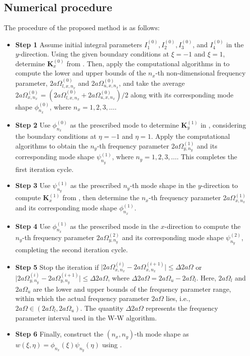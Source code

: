 \documentclass[preprint,12pt,number]{elsarticle}
\begin{document}
\subsection{Numerical procedure}\label{sec:Application procedure}
The procedure of the proposed method is as follows:   
\begin{itemize}[]
\item \textbf{Step 1} Assume initial integral parameters $I^{(0)}_1, I^{(0)}_2, I^{(0)}_3$, and $I^{(0)}_4$ in the $y$-direction. Using the given boundary conditions at $\xi = -1$ and $\xi = 1$, determine $\mathbf{K}^{(0)}_x$ from . 
Then, apply the computational algorithms in  to compute the lower and upper bounds of the $n_x$-th non-dimensional frequency parameter, $2a\Omega^{(0)}_{l,x,n_x}$ and $2a\Omega^{(0)}_{u,x,n_x}$, and take the average $2a\Omega^{(0)}_{x,n_x} = (2a\Omega^{(0)}_{l,x,n_x} + 2a\Omega^{(0)}_{u,x,n_x})/2$ along with its corresponding mode shape $\phi^{(0)}_{n_x}$, where $n_x = 1, 2, 3, \ldots$.

\item \textbf{Step 2} Use $\phi^{(0)}_{n_x}$ as the prescribed mode to determine $\mathbf{K}^{(1)}_y$ in , considering the boundary conditions at $\eta = -1$ and $\eta = 1$. 
Apply the computational algorithms to obtain the $n_y$-th frequency parameter $2a\Omega^{(1)}_{y,n_y}$ and its corresponding mode shape $\psi^{(1)}_{n_y}$, where $n_y = 1, 2, 3, \ldots$. This completes the first iteration cycle.  

\item \textbf{Step 3} Use $\psi^{(1)}_{n_y}$ as the prescribed $n_y$-th mode shape in the $y$-direction to compute $\mathbf{K}^{(1)}_x$ from , then determine the $n_x$-th frequency parameter $2a\Omega^{(1)}_{x,n_x}$ and its corresponding mode shape $\phi^{(1)}_{n_x}$.  

\item \textbf{Step 4} Use $\phi^{(1)}_{n_x}$ as the prescribed mode in the $x$-direction to compute the $n_y$-th frequency parameter $2a\Omega^{(2)}_{y,n_y}$ and its corresponding mode shape $\psi^{(2)}_{n_y}$, completing the second iteration cycle.  

\item \textbf{Step 5} Stop the iteration if $\lvert 2a\Omega^{(i)}_{x,n_x} - 2a\Omega^{(i+1)}_{x,n_x} \rvert \leq \Delta 2a\Omega$ or $\lvert 2a\Omega^{(i)}_{y,n_y} - 2a\Omega^{(i+1)}_{y,n_y} \rvert \leq \Delta 2a\Omega$, where $\Delta 2a\Omega = 2a\Omega_u - 2a\Omega_l$. Here, $2a\Omega_l$ and $2a\Omega_u$ are the lower and upper bounds of the frequency parameter range, within which the actual frequency parameter $2a\Omega$ lies, i.e., $2a\Omega \in (2a\Omega_l, 2a\Omega_u)$. The quantity $\Delta 2a\Omega$ represents the frequency parameter interval used in the W-W algorithm.

\item \textbf{Step 6} Finally, construct the $(n_x, n_y)$-th mode shape as $w(\xi, \eta) = \phi_{n_x}(\xi) \psi_{n_y}(\eta)$ using .  
\end{itemize}
\end{document}
